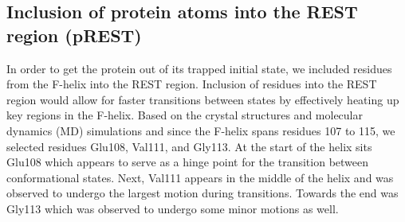 \documentclass{article}
\begin{document}
      
\subsection{Inclusion of protein atoms into the REST region (pREST)}
In order to get the protein out of its trapped initial state, we included residues from the F-helix into the REST region.
Inclusion of residues into the REST region would allow for faster transitions between states by effectively heating up key regions in the F-helix.
Based on the crystal structures and molecular dynamics (MD) simulations and since the F-helix spans residues 107 to 115, we selected residues Glu108, Val111, and Gly113.
At the start of the helix sits Glu108 which appears to serve as a hinge point for the transition between conformational states. 
Next, Val111 appears in the middle of the helix and was observed to undergo the largest motion during transitions. 
Towards the end was Gly113 which was observed to undergo some minor motions as well.
\end{document}
